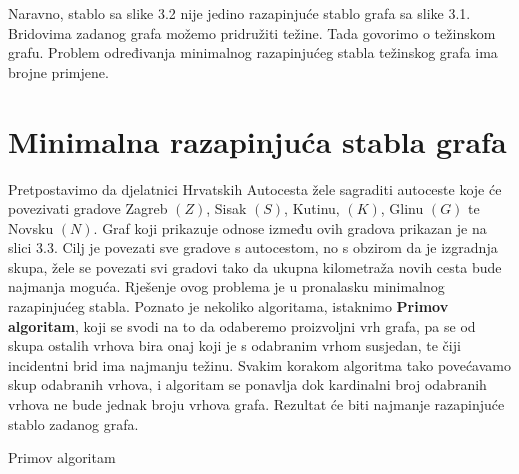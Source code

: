 \documentclass[times, utf8, zavrsni]{fer}
\begin{document}
Naravno, stablo sa slike 3.2 nije jedino razapinjuće stablo grafa sa slike 3.1. Bridovima zadanog grafa možemo pridružiti težine. Tada govorimo o težinskom grafu. Problem određivanja minimalnog razapinjućeg stabla težinskog grafa ima brojne primjene.

\section{Minimalna razapinjuća stabla grafa}

Pretpostavimo da djelatnici Hrvatskih Autocesta žele sagraditi autoceste koje će povezivati gradove Zagreb $(Z)$, Sisak $(S)$, Kutinu, $(K)$, Glinu $(G)$ te Novsku $(N)$. Graf koji prikazuje odnose između ovih gradova prikazan je na slici 3.3. Cilj je povezati sve gradove s autocestom, no s obzirom da je izgradnja skupa, žele se povezati svi gradovi tako da ukupna kilometraža novih cesta bude najmanja moguća. Rješenje ovog problema je u pronalasku minimalnog razapinjućeg stabla. Poznato je nekoliko algoritama, istaknimo \textbf{Primov algoritam}, koji se svodi na to da odaberemo proizvoljni vrh grafa, pa se od skupa ostalih vrhova bira onaj koji je s odabranim vrhom susjedan, te čiji incidentni brid ima najmanju težinu. Svakim korakom algoritma tako povećavamo skup odabranih vrhova, i algoritam se ponavlja dok kardinalni broj odabranih vrhova ne bude jednak broju vrhova grafa. Rezultat će biti najmanje razapinjuće stablo zadanog grafa.

\begin{algorithm}
	\caption{Primov algoritam}
	\label{algo:prim-algorithm}
	\begin{algorithmic}
		\ENDWHILE
	\end{algorithmic}
\end{algorithm}

\newpage
\end{document}
